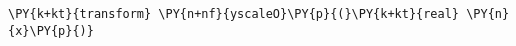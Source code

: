 \begin{Verbatim}[commandchars=\\\{\}]
    \PY{k+kt}{transform} \PY{n+nf}{yscaleO}\PY{p}{(}\PY{k+kt}{real} \PY{n}{x}\PY{p}{)}
\end{Verbatim}
